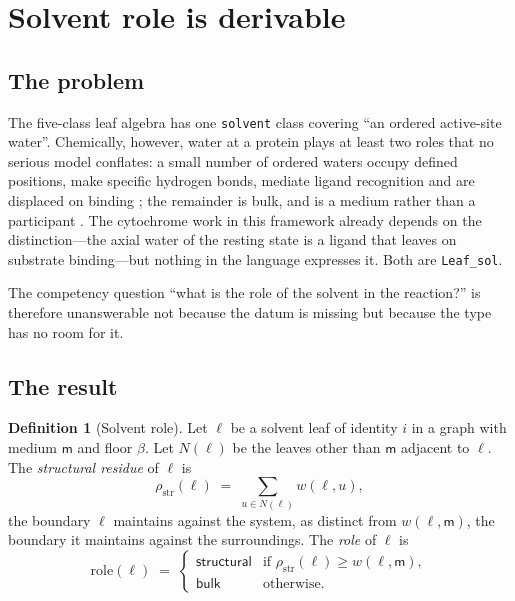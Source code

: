\documentclass[11pt,twocolumn,a4paper]{article}
\theoremstyle{thmstyle}
\theoremstyle{definition}
\newtheorem{definition}[theorem]{Definition}
\theoremstyle{remark}
\newcommand{\flo}{\beta}
\newcommand{\res}{\rho}
\newcommand{\med}{\mathsf{m}}
\newcommand{\shk}[1]{\texttt{#1}}
\newcommand{\Str}{\textsf{structural}}
\newcommand{\Blk}{\textsf{bulk}}
\begin{document}
\section{Solvent role is derivable}
\label{sec:solvent}

\subsection{The problem}

The five-class leaf algebra \citep{sachikonye2025expralg} has one
\shk{solvent} class covering ``an ordered active-site water''. Chemically,
however, water at a protein plays at least two roles that no serious
model conflates: a small number of ordered waters occupy defined
positions, make specific hydrogen bonds, mediate ligand recognition and
are displaced on binding \citep{poornima1995hydration,levy2006water};
the remainder is bulk, and is a medium rather than a participant
\citep{ball2008water}. The cytochrome work in this framework already
depends on the distinction---the axial water of the resting state is a
ligand that leaves on substrate binding---but nothing in the language
expresses it. Both are \shk{Leaf\_sol}.

The competency question ``what is the role of the solvent in the
reaction?'' \citep[slide~8]{doerr2025limits} is therefore unanswerable
not because the datum is missing but because the type has no room for it.

\subsection{The result}

\begin{definition}[Solvent role]
\label{def:solvent-role}
Let $\ell$ be a solvent leaf of identity $i$ in a graph with medium
$\med$ and floor $\flo$. Let $N(\ell)$ be the leaves other than $\med$
adjacent to $\ell$. The \emph{structural residue} of $\ell$ is
\[
\res_{\mathrm{str}}(\ell)
  \;=\; \sum_{u\in N(\ell)} w(\ell,u),
\]
the boundary $\ell$ maintains against the system, as distinct from
$w(\ell,\med)$, the boundary it maintains against the surroundings. The
\emph{role} of $\ell$ is
\[
\mathrm{role}(\ell) \;=\;
\begin{cases}
\Str & \text{if } \res_{\mathrm{str}}(\ell) \ge w(\ell,\med),\\[2pt]
\Blk & \text{otherwise.}
\end{cases}
\]
\end{definition}
\end{document}
